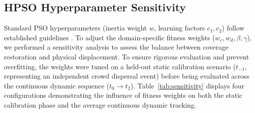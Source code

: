 \subsection{HPSO Hyperparameter Sensitivity}
\label{sec:hyperparams}

Standard PSO hyperparameters (inertia weight $w$, learning factors $c_1, c_2$) follow established guidelines \cite{b11,b13}. To adjust the domain-specific fitness weights ($w_c, w_d, \beta, \gamma$), we performed a sensitivity analysis to assess the balance between coverage restoration and physical displacement. To ensure rigorous evaluation and prevent overfitting, the weights were tuned on a held-out static calibration scenario ($t_{-1}$, representing an independent crowd dispersal event) before being evaluated across the continuous dynamic sequence ($t_0 \to t_2$). Table~\ref{tab:sensitivity} displays four configurations demonstrating the influence of fitness weights on both the static calibration phase and the average continuous dynamic tracking.

\begin{table}[t]
\centering
\caption{Fitness Weight Sensitivity Analysis}
\label{tab:sensitivity}
\vspace{-5pt}
\end{table}


